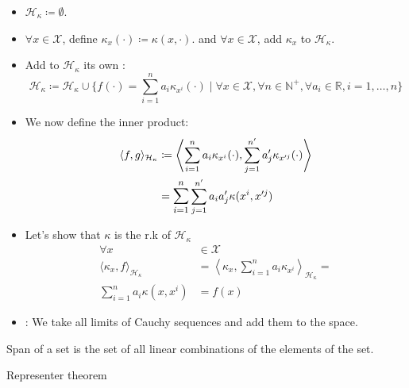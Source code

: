 \begin{itemize}
	\item $\mathcal{H}_\kappa \coloneqq \emptyset$.
	\item $\forall x \in \mathcal{X}$, define $\kappa_x(\cdot) \coloneqq \kappa(x, \cdot)$.
	      and $\forall x \in \mathcal{X}$, add $\kappa_x$ to $\mathcal{H}_\kappa$.
	\item Add to $\mathcal{H}_\kappa$ its own :
	      \begin{equation*}
		      \mathcal{H}_\kappa \coloneqq \mathcal{H}_\kappa \cup \{
		      f(\cdot) = \sum_{i=1}^n a_i \kappa_{x^i}(\cdot) \mid
		      \forall x \in \mathcal{X},
		      \forall n \in \mathds{N}^+,
		      \forall a_i \in \mathds{R},
		      i=1,\dots,n
		      \}
	      \end{equation*}
	\item We now define the inner product:
	      \begin{align*}
          \langle f, g \rangle_{\mathcal{H}_\kappa} &\coloneqq
		      \left\langle
            \sum_{i=1}^n a_i \kappa_{x^i}(\cdot), \sum_{j=1}^{n'} a'_j \kappa_{x'^j}(\cdot)
		      \right\rangle \\
                                                    &= \mathlarger{\sum_{i=1}^n} \sum_{j=1}^{n'} a_i a'_j \kappa({x^i}, {x'^j})
	      \end{align*}
      \item Let's show that $\kappa$ is the r.k of $\mathcal{H}_\kappa$
        \begin{align*}
          \forall x &\in \mathcal{X} \\
          \langle \kappa_x, f \rangle_{\mathcal{H}_\kappa} &=
          \left\langle \kappa_x, \sum_{i=1}^n a_i \kappa_{x^i} \right\rangle_{\mathcal{H}_\kappa} = \\
          \sum_{i=1}^n a_i \kappa(x, x^i) &= f(x)
        \end{align*}
      \item {}: We take all limits of Cauchy sequences
        and add them to the space.
\end{itemize}

\begin{definition}{Span of a set}{}
	 is the set of all linear combinations of the elements of the set.
\end{definition}

\begin{theorem}{Representer theorem}{}
\end{theorem}
